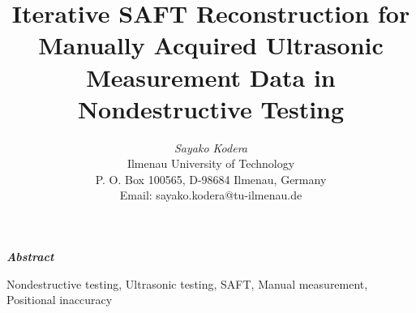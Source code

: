 \documentclass[10pt,twocolumn,a4paper,conference]{IEEEtran}
\begin{document}
\title{\bf Iterative SAFT Reconstruction for Manually Acquired Ultrasonic Measurement Data in Nondestructive Testing}

\author{
\textit{Sayako Kodera}\\
Ilmenau University of Technology\\
P. O. Box 100565, D-98684 Ilmenau, Germany \\
Email: sayako.kodera@tu-ilmenau.de
} 

\maketitle

{\bf {\bf \slshape Abstract } %
  
}


\smallskip

\begin{IEEEkeywords}
   Nondestructive testing, Ultrasonic testing, SAFT, Manual measurement, Positional inaccuracy
\end{IEEEkeywords}

\end{document}
